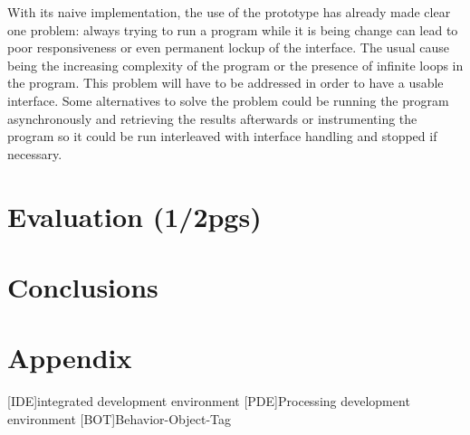 \documentclass{./llncs2e/llncs}
\begin{document}
	With its naive implementation, the use of the prototype has already made clear one problem: always trying to run a program while it is being change can lead to poor responsiveness or even permanent lockup of the interface. The usual cause being the increasing complexity of the program or the presence of infinite loops in the program. This problem will have to be addressed in order to have a usable interface. Some alternatives to solve the problem could be running the program asynchronously and retrieving the results afterwards or instrumenting the program so it could be run interleaved with interface handling and stopped if necessary.



\section{Evaluation (1/2pgs)}

\section{Conclusions}

\newpage
\appendix
\section{Appendix}
\label{sec:attachments}

\begin{acronym}
	[IDE]{integrated development environment}
	[PDE]{Processing development environment}
	[BOT]{Behavior-Object-Tag}
\end{acronym}

% 
% 
 

 
\end{document}
